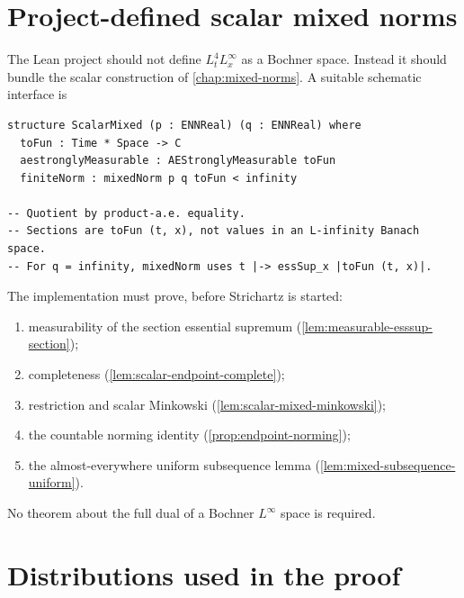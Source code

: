 \documentclass[11pt,oneside]{book}
\theoremstyle{definition}
\theoremstyle{remark}
\newcommand{\1}{\mathbf 1}
\begin{document}
\section{Project-defined scalar mixed norms}

The Lean project should not define $L^4_tL^\infty_x$ as a Bochner space.
Instead it should bundle the scalar construction of
\cref{chap:mixed-norms}.  A suitable schematic interface is
\begin{verbatim}
structure ScalarMixed (p : ENNReal) (q : ENNReal) where
  toFun : Time * Space -> C
  aestronglyMeasurable : AEStronglyMeasurable toFun
  finiteNorm : mixedNorm p q toFun < infinity

-- Quotient by product-a.e. equality.
-- Sections are toFun (t, x), not values in an L-infinity Banach space.
-- For q = infinity, mixedNorm uses t |-> essSup_x |toFun (t, x)|.
\end{verbatim}
The implementation must prove, before Strichartz is started:
\begin{enumerate}
\item measurability of the section essential supremum
      (\cref{lem:measurable-esssup-section});
\item completeness (\cref{lem:scalar-endpoint-complete});
\item restriction and scalar Minkowski
      (\cref{lem:scalar-mixed-minkowski});
\item the countable norming identity
      (\cref{prop:endpoint-norming});
\item the almost-everywhere uniform subsequence lemma
      (\cref{lem:mixed-subsequence-uniform}).
\end{enumerate}
No theorem about the full dual of a Bochner $L^\infty$ space is required.

\section{Distributions used in the proof}
\end{document}
